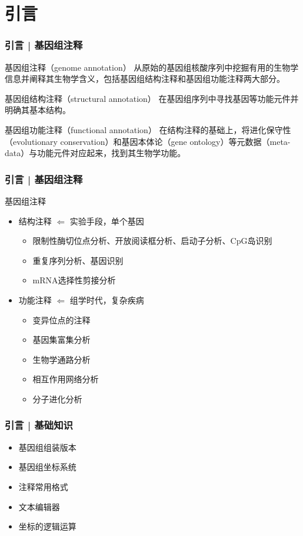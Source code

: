 \section{引言}
\begin{frame}
  \frametitle{引言 | 基因组注释}
  \begin{block}{基因组注释（genome annotation）}
    从原始的基因组核酸序列中挖掘有用的生物学信息并阐释其生物学含义，包括基因组结构注释和基因组功能注释两大部分。
  \end{block}
  \pause
  \begin{block}{基因组结构注释（structural annotation）}
    在基因组序列中寻找基因等功能元件并明确其基本结构。
  \end{block}
  \pause
  \begin{block}{基因组功能注释（functional annotation）}
    在结构注释的基础上，将进化保守性（evolutionary conservation）和基因本体论（gene ontology）等元数据（meta-data）与功能元件对应起来，找到其生物学功能。
  \end{block}
\end{frame}

\begin{frame}
  \frametitle{引言 | 基因组注释}
  \begin{block}{基因组注释}
    \begin{itemize}
      \item 结构注释 $\Leftarrow$ 实验手段，单个基因
      \begin{itemize}
        \item 限制性酶切位点分析、开放阅读框分析、启动子分析、CpG岛识别
        \item 重复序列分析、基因识别
        \item mRNA选择性剪接分析
      \end{itemize}
      \item 功能注释 $\Leftarrow$ 组学时代，复杂疾病
      \begin{itemize}
        \item 变异位点的注释
        \item 基因集富集分析
        \item 生物学通路分析
        \item 相互作用网络分析
        \item 分子进化分析
      \end{itemize}
    \end{itemize}
  \end{block}
\end{frame}

\begin{frame}
  \frametitle{引言 | 基础知识}
  \begin{itemize}
    \item 基因组组装版本
    \item 基因组坐标系统
    \item 注释常用格式
    \item 文本编辑器
    \item 坐标的逻辑运算
  \end{itemize}
\end{frame}

